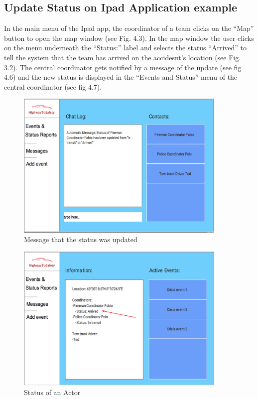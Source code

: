  
\subsection{Update Status on Ipad Application example}
In the main menu of the Ipad app, the coordinator of a team clicks on the “Map”
button to open the map window (see Fig. 4.3). In the map window the user clicks
on the menu underneath the “Status:” label and selects the status “Arrived” to tell the system that the
team has arrived on the accidesnt's location (see Fig. 3.2). The central
coordinator gets notified by a message of the update (see fig 4.6) and the new
status is displayed in the “Events and Status” menu of the central
coordinator (see fig 4.7).


\begin{minipage}{1.0\textwidth}
\begin{figure}[H]
\caption{Message that the status was updated}
\includegraphics[width=0.9\textwidth]{status_change_message.eps}
\end{figure}
\end{minipage}

\begin{minipage}{1.0\textwidth}
\begin{figure}[H]
\caption{Status of an Actor}
\includegraphics[width=0.9\textwidth]{Status_change.eps}
\end{figure}
\end{minipage}


